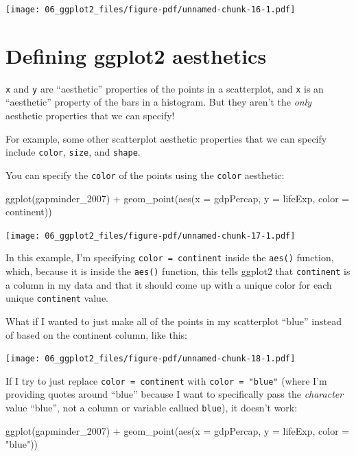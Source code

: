 \documentclass[
  letterpaper,
  DIV=11,
  numbers=noendperiod]{scrreprt}
\newenvironment{Shaded}{\begin{snugshade}}{\end{snugshade}}
\newcommand{\AttributeTok}[1]{\textcolor[rgb]{0.40,0.45,0.13}{#1}}
\newcommand{\FunctionTok}[1]{\textcolor[rgb]{0.28,0.35,0.67}{#1}}
\newcommand{\NormalTok}[1]{\textcolor[rgb]{0.00,0.23,0.31}{#1}}
\newcommand{\SpecialCharTok}[1]{\textcolor[rgb]{0.37,0.37,0.37}{#1}}
\newcommand{\StringTok}[1]{\textcolor[rgb]{0.13,0.47,0.30}{#1}}
\begin{document}
\texttt{[image: 06\_ggplot2\_files/figure-pdf/unnamed-chunk-16-1.pdf]}

\section{Defining ggplot2 aesthetics}\label{defining-ggplot2-aesthetics}

\texttt{x} and \texttt{y} are ``aesthetic'' properties of the points in
a scatterplot, and \texttt{x} is an ``aesthetic'' property of the bars
in a histogram. But they aren't the \emph{only} aesthetic properties
that we can specify!

For example, some other scatterplot aesthetic properties that we can
specify include \texttt{color}, \texttt{size}, and \texttt{shape}.

You can specify the \texttt{color} of the points using the
\texttt{color} aesthetic:

\begin{Shaded}
\begin{Highlighting}[]
\FunctionTok{ggplot}\NormalTok{(gapminder\_2007) }\SpecialCharTok{+} 
  \FunctionTok{geom\_point}\NormalTok{(}\FunctionTok{aes}\NormalTok{(}\AttributeTok{x =}\NormalTok{ gdpPercap, }\AttributeTok{y =}\NormalTok{ lifeExp, }\AttributeTok{color =}\NormalTok{ continent))}
\end{Highlighting}
\end{Shaded}

\texttt{[image: 06\_ggplot2\_files/figure-pdf/unnamed-chunk-17-1.pdf]}

In this example, I'm specifying \texttt{color\ =\ continent} inside the
\texttt{aes()} function, which, because it is inside the \texttt{aes()}
function, this tells ggplot2 that \texttt{continent} is a column in my
data and that it should come up with a unique color for each unique
\texttt{continent} value.

What if I wanted to just make all of the points in my scatterplot
``blue'' instead of based on the continent column, like this:

\texttt{[image: 06\_ggplot2\_files/figure-pdf/unnamed-chunk-18-1.pdf]}

If I try to just replace \texttt{color\ =\ continent} with
\texttt{color\ =\ "blue"} (where I'm providing quotes around ``blue''
because I want to specifically pass the \emph{character} value ``blue'',
not a column or variable callued \texttt{blue}), it doesn't work:

\begin{Shaded}
\begin{Highlighting}[]
\FunctionTok{ggplot}\NormalTok{(gapminder\_2007) }\SpecialCharTok{+} 
  \FunctionTok{geom\_point}\NormalTok{(}\FunctionTok{aes}\NormalTok{(}\AttributeTok{x =}\NormalTok{ gdpPercap, }\AttributeTok{y =}\NormalTok{ lifeExp, }\AttributeTok{color =} \StringTok{"blue"}\NormalTok{))}
\end{Highlighting}
\end{Shaded}
\end{document}
